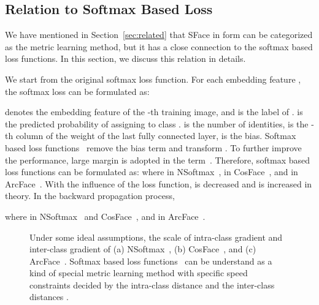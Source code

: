 \documentclass[journal,comsoc]{IEEEtran}
\begin{document}
\subsection{Relation to Softmax Based Loss}
\label{subsection:relation}
We have mentioned in Section~\ref{sec:related} that SFace in form can be categorized as the metric learning method, but it has a close connection to the softmax based loss functions. In this section, we discuss this relation in details. 

We start from the original softmax loss function. For each embedding feature , the softmax loss can be formulated as:

 denotes the embedding feature of the -th training image, and  is the label of .  is the predicted probability of assigning  to class .  is the number of identities,  is the -th column of the weight of the last fully connected layer,  is the bias. Softmax based loss functions~\cite{wang2017normface,Liu2017SphereFace,Wang2018CosFace,deng2019arcface} remove the bias term and transform . To further improve the performance, large margin is adopted in the  term~\cite{Liu2017SphereFace,Wang2018CosFace,deng2019arcface}. Therefore, softmax based loss functions can be formulated as:
where  in NSoftmax~\cite{wang2017normface},  in CosFace~\cite{Wang2018CosFace}, and  in ArcFace~\cite{deng2019arcface}. With the influence of the loss function,  is decreased and  is increased in theory. In the backward propagation process, 

where  in NSoftmax~\cite{wang2017normface} and CosFace~\cite{Wang2018CosFace}, and  in ArcFace~\cite{deng2019arcface}. 



\begin{figure}[htbp]
	\centering
	
	
	\caption{Under some ideal assumptions, the scale of intra-class gradient  and inter-class gradient  of (a) NSoftmax~\cite{wang2017normface}, (b) CosFace~\cite{Wang2018CosFace}, and (c) ArcFace~\cite{deng2019arcface}.  Softmax based loss functions~\cite{wang2017normface,Wang2018CosFace,deng2019arcface} can be understand as a kind of special metric learning method with specific speed constraints decided by the intra-class distance  and the inter-class distances .}
	\label{fig:soft_method_curves}
\end{figure}
\end{document}
